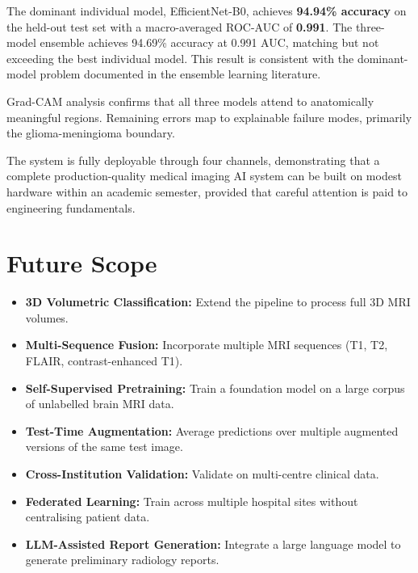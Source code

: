 \documentclass[12pt,a4paper,oneside]{report}
\begin{document}
The dominant individual model, EfficientNet-B0, achieves \textbf{94.94\% accuracy} on the held-out test set with a macro-averaged ROC-AUC of \textbf{0.991}. The three-model ensemble achieves 94.69\% accuracy at 0.991 AUC, matching but not exceeding the best individual model. This result is consistent with the dominant-model problem documented in the ensemble learning literature.

Grad-CAM analysis confirms that all three models attend to anatomically meaningful regions. Remaining errors map to explainable failure modes, primarily the glioma-meningioma boundary.

The system is fully deployable through four channels, demonstrating that a complete production-quality medical imaging AI system can be built on modest hardware within an academic semester, provided that careful attention is paid to engineering fundamentals.

\section{Future Scope}

\begin{itemize}[leftmargin=*]
  \item \textbf{3D Volumetric Classification:} Extend the pipeline to process full 3D MRI volumes.
  \item \textbf{Multi-Sequence Fusion:} Incorporate multiple MRI sequences (T1, T2, FLAIR, contrast-enhanced T1).
  \item \textbf{Self-Supervised Pretraining:} Train a foundation model on a large corpus of unlabelled brain MRI data.
  \item \textbf{Test-Time Augmentation:} Average predictions over multiple augmented versions of the same test image.
  \item \textbf{Cross-Institution Validation:} Validate on multi-centre clinical data.
  \item \textbf{Federated Learning:} Train across multiple hospital sites without centralising patient data.
  \item \textbf{LLM-Assisted Report Generation:} Integrate a large language model to generate preliminary radiology reports.
\end{itemize}
\end{document}
